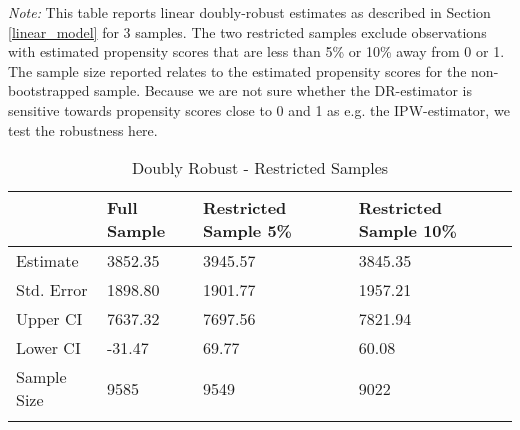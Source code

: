 \begin{scriptsize}
			\def\sym#1{\ifmmode^{#1}\else\(^{#1}\)\fi}
			\begin{ThreePartTable}
				\begin{TableNotes}
					\begin{scriptsize}
					\item \textit{Note:} This table reports linear doubly-robust estimates as described in Section \ref{linear_model}  for 3 samples. The two restricted samples exclude observations with estimated propensity scores that are less than 5\% or 10\% away from 0 or 1. The sample size reported relates to the estimated propensity scores for the non-bootstrapped sample.
Because we are not sure whether the DR-estimator is sensitive towards propensity scores close to 0 and 1 as  e.g. the IPW-estimator, we test the robustness here.
					\end{scriptsize}
				\end{TableNotes}
				
				\begin{longtable}{l C{1.45cm} C{1.45cm} C{1.45cm}}
					\caption{Doubly Robust - Restricted Samples}\label{tab_dr_robustness}\\
					  \hline
 & Full Sample & Restricted Sample 5\% & Restricted Sample 10\% \\ 
  \hline
Estimate & 3852.35 & 3945.57 & 3845.35 \\ 
  Std. Error & 1898.80 & 1901.77 & 1957.21 \\ 
  Upper CI & 7637.32 & 7697.56 & 7821.94 \\ 
  Lower CI & -31.47 & 69.77 & 60.08 \\ 
  \hline
  Sample Size & 9585 & 9549 & 9022\\
    \hline
				\insertTableNotes \\
				\end{longtable} 

				
			\end{ThreePartTable}
	\end{scriptsize}

